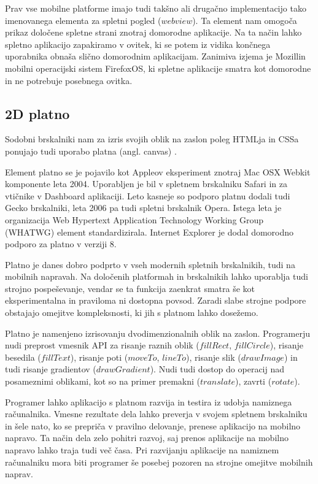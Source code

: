 Prav vse mobilne platforme imajo tudi takšno ali drugačno implementacijo tako imenovanega elementa za spletni pogled ($webview$). Ta element nam omogoča prikaz določene spletne strani znotraj domorodne aplikacije. Na ta način lahko spletno aplikacijo zapakiramo v ovitek, ki se potem iz vidika končnega uporabnika obnaša slično domorodnim aplikacijam. Zanimiva izjema je Mozillin mobilni operacijski sistem FirefoxOS, ki spletne aplikacije smatra kot domorodne in ne potrebuje posebnega ovitka.

\subsection{2D platno}
\label{sec:2dcanvas}
Sodobni brskalniki nam za izris svojih oblik na zaslon poleg HTMLja in CSSa ponujajo tudi uporabo platna (angl. canvas) \cite{canvas}. 

Element platno se je pojavilo kot Appleov eksperiment znotraj Mac OSX Webkit komponente leta 2004. Uporabljen je bil v spletnem brskalniku Safari in za vtičnike v Dashboard aplikaciji. Leto kasneje so podporo platnu dodali tudi Gecko brskalniki, leta 2006 pa tudi spletni brskalnik Opera. Istega leta je organizacija Web Hypertext Application Technology Working Group (WHATWG) element standardizirala. Internet Explorer je dodal domorodno podporo za platno v verziji 8.

Platno je danes dobro podprto v vseh modernih spletnih brskalnikih, tudi na mobilnih napravah. Na določenih platformah in brskalnikih lahko uporablja tudi strojno pospeševanje, vendar se ta funkcija zaenkrat smatra še kot eksperimentalna in praviloma ni dostopna povsod. Zaradi slabe strojne podpore obstajajo omejitve kompleksnosti, ki jih s platnom lahko dosežemo.


Platno je namenjeno izrisovanju dvodimenzionalnih oblik na zaslon. Programerju nudi preprost vmesnik API za risanje raznih oblik ($fillRect$, $fillCircle$), risanje besedila ($fillText$), risanje poti ($moveTo$, $lineTo$), risanje slik ($drawImage$) in tudi risanje gradientov ($drawGradient$). Nudi tudi dostop do operacij nad posameznimi oblikami, kot so na primer premakni ($translate$), zavrti ($rotate$). 

Programer lahko aplikacijo s platnom razvija in testira iz udobja namiznega računalnika. Vmesne rezultate dela lahko preverja v svojem spletnem brskalniku in šele nato, ko se prepriča v pravilno delovanje, prenese aplikacijo na mobilno napravo. Ta način dela zelo pohitri razvoj, saj prenos aplikacije na mobilno napravo lahko traja tudi več časa. Pri razvijanju aplikacije na namiznem računalniku mora biti programer še posebej pozoren na strojne omejitve mobilnih naprav. 


